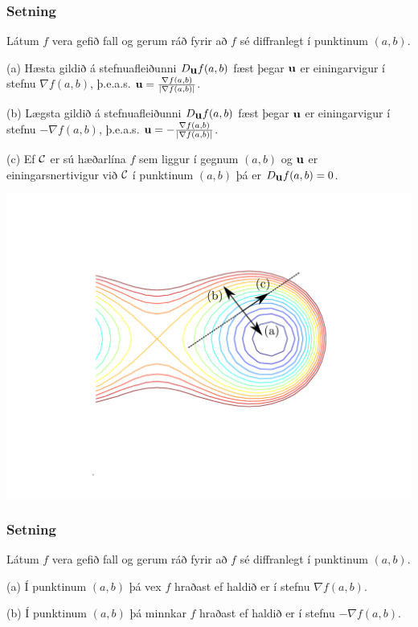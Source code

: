 \subsubsection{Setning }
 Látum $f$ vera gefið fall og gerum ráð fyrir að
$f$ sé diffranlegt í punktinum $(a,b)$.

\medskip
(a)  Hæsta gildið á stefnuafleiðunni $D_{\mbox{${\bf u}$}}f(a,b)$ fæst þegar $\mbox{${\bf u}$}$
er einingarvigur í stefnu $\nabla f(a,b)$, þ.e.a.s. $\mbox{${\bf u}$}=\frac{\nabla
  f(a,b)}{|\nabla f(a,b)|}$.  

\medskip
(b)  Lægsta gildið á stefnuafleiðunni $D_{\mbox{${\bf u}$}}f(a,b)$ fæst þegar $\mbox{${\bf u}$}$
er einingarvigur í stefnu $-\nabla f(a,b)$, þ.e.a.s. $\mbox{${\bf u}$}=-\frac{\nabla
  f(a,b)}{|\nabla f(a,b)|}$. 

\medskip
(c)  Ef $\cal C$ er sú hæðarlína $f$ sem liggur í gegnum $(a,b)$ og
$\mbox{${\bf u}$}$ er einingarsnertivigur við $\cal C$ í punktinum $(a,b)$ þá er
$D_{\mbox{${\bf u}$}}f(a,b)=0$.  




   \centering
            \includegraphics[width=1\linewidth]{contours.pdf}
 

\subsubsection{Setning }
Látum $f$ vera gefið fall og gerum ráð fyrir að
$f$ sé diffranlegt í punktinum $(a,b)$.  

\medskip
(a) Í punktinum $(a,b)$ þá vex $f$ hraðast ef haldið er í stefnu
$\nabla f(a,b)$.  

\medskip
(b) Í punktinum $(a,b)$ þá minnkar $f$ hraðast ef haldið er í stefnu
$-\nabla f(a,b)$.  

